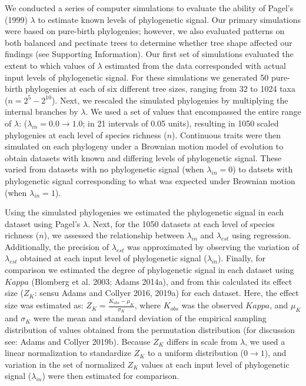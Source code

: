 \documentclass[
]{article}
\begin{document}
We conducted a series of computer simulations to evaluate the ability of
Pagel's (1999) \(\lambda\) to estimate known levels of phylogenetic
signal. Our primary simulations were based on pure-birth phylogenies;
however, we also evaluated patterns on both balanced and pectinate trees
to determine whether tree shape affected our findings (see Supporting
Information). Our first set of simulations evaluated the extent to which
values of \(\lambda\) estimated from the data corresponded with actual
input levels of phylogenetic signal. For these simulations we generated
50 pure-birth phylogenies at each of six different tree sizes, ranging
from 32 to 1024 taxa (\(n=2^5 - 2^{10}\)). Next, we rescaled the
simulated phylogenies by multiplying the internal branches by
\(\lambda\). We used a set of values that encompassed the entire range
of \(\lambda\): (\(\lambda_{in} = 0.0 \to 1.0\); in 21 intervals of 0.05
units), resulting in 1050 scaled phylogenies at each level of species
richness (\(n\)). Continuous traits were then simulated on each
phylogeny under a Brownian motion model of evolution to obtain datasets
with known and differing levels of phylogenetic signal. These varied
from datasets with no phylogenetic signal (when \(\lambda_{in} =0\)) to
datsets with phylogenetic signal corresponding to what was expected
under Brownian motion (when \(\lambda_{in} =1\)). \hfill\break

Using the simulated phylogenies we estimated the phylogenetic signal in
each dataset using Pagel's \(\lambda\). Next, for the 1050 datasets at
each level of species richness (\(n\)), we assessed the relationship
between \(\lambda_{in}\) and \(\lambda_{est}\) using regression.
Additionally, the precision of \(\lambda_{est}\) was approximated by
observing the variation of \(\lambda_{est}\) obtained at each input
level of phylogenetic signal (\(\lambda_{in}\)). Finally, for comparison
we estimated the degree of phylogenetic signal in each dataset using
\(Kappa\) (Blomberg et al. 2003; Adams 2014a), and from this calculated
its effect size (\(Z_K\): sensu Adams and Collyer 2016, 2019a) for each
dataset. Here, the effect size was estimated as:
\(Z_K=\frac{K_{obs}-\mu_K}{\sigma_K}\), where \(K_{obs}\) was the
observed \(Kappa\), and \(\mu_K\) and \(\sigma_K\) were the mean and
standard deviation of the empirical sampling distribution of values
obtained from the permutation distribution (for discussion see: Adams
and Collyer 2019b). Because \(Z_K\) differs in scale from \(\lambda\),
we used a linear normalization to standardize \(Z_K\) to a uniform
distribution (\(0\rightarrow1\)), and variation in the set of normalized
\(Z_K\) values at each input level of phylogenetic signal
(\(\lambda_{in}\)) were then estimated for comparison. \hfill\break
\end{document}
